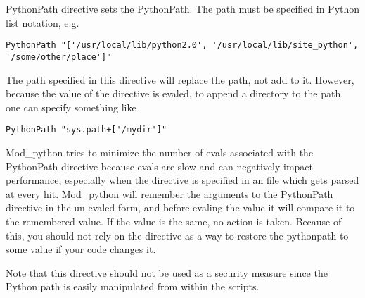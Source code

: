 PythonPath directive sets the PythonPath. The path must be specified
in Python list notation, e.g.

\begin{verbatim}
PythonPath "['/usr/local/lib/python2.0', '/usr/local/lib/site_python', '/some/other/place']"
\end{verbatim}

The path specified in this directive will replace the path, not add to
it. However, because the value of the directive is evaled, to append a
directory to the path, one can specify something like

\begin{verbatim}
PythonPath "sys.path+['/mydir']"
\end{verbatim}

Mod_python tries to minimize the number of evals associated with the
PythonPath directive because evals are slow and can negatively impact
performance, especially when the directive is specified in an
 file which gets parsed at every hit. Mod_python will
remember the arguments to the PythonPath directive in the un-evaled
form, and before evaling the value it will compare it to the
remembered value. If the value is the same, no action is
taken. Because of this, you should not rely on the directive as a way
to restore the pythonpath to some value if your code changes it.

Note that this directive should not be used as a security measure
since the Python path is easily manipulated from within the scripts.

